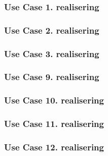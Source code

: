 \subsubsection{ Use Case 1. realisering	}


\subsubsection{ Use Case 2. realisering	}


\subsubsection{ Use Case 3. realisering	}


\subsubsection{ Use Case 9. realisering	}


\subsubsection{ Use Case 10. realisering	}


\subsubsection{ Use Case 11. realisering	}


\subsubsection{ Use Case 12. realisering	}
